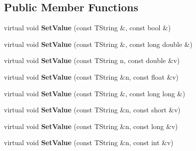 \subsection*{Public Member Functions}
\begin{DoxyCompactItemize}
\item 
\hypertarget{class_h_a_l_1_1_analysis_data_a3870a72f6b39f3b4509b2498d285d94a}{virtual void {\bfseries Set\-Value} (const T\-String \&, const bool \&)}\label{class_h_a_l_1_1_analysis_data_a3870a72f6b39f3b4509b2498d285d94a}

\item 
\hypertarget{class_h_a_l_1_1_analysis_data_af74aff588a73f1c4d0a5e5ecbad14efb}{virtual void {\bfseries Set\-Value} (const T\-String \&, const long double \&)}\label{class_h_a_l_1_1_analysis_data_af74aff588a73f1c4d0a5e5ecbad14efb}

\item 
\hypertarget{class_h_a_l_1_1_analysis_data_ae88cc39a2594cf0bb969e3626cf17412}{virtual void {\bfseries Set\-Value} (const T\-String n, const double \&v)}\label{class_h_a_l_1_1_analysis_data_ae88cc39a2594cf0bb969e3626cf17412}

\item 
\hypertarget{class_h_a_l_1_1_analysis_data_a3953675a3b647f8c87eb214e25940d77}{virtual void {\bfseries Set\-Value} (const T\-String \&n, const float \&v)}\label{class_h_a_l_1_1_analysis_data_a3953675a3b647f8c87eb214e25940d77}

\item 
\hypertarget{class_h_a_l_1_1_analysis_data_ad18a729c4979bacc30d32e0802520236}{virtual void {\bfseries Set\-Value} (const T\-String \&, const long long \&)}\label{class_h_a_l_1_1_analysis_data_ad18a729c4979bacc30d32e0802520236}

\item 
\hypertarget{class_h_a_l_1_1_analysis_data_a2d3510dc4ee329387906e8738061b6b4}{virtual void {\bfseries Set\-Value} (const T\-String \&n, const short \&v)}\label{class_h_a_l_1_1_analysis_data_a2d3510dc4ee329387906e8738061b6b4}

\item 
\hypertarget{class_h_a_l_1_1_analysis_data_af8f2df54ad897dce65aa6224cac0af7c}{virtual void {\bfseries Set\-Value} (const T\-String \&n, const long \&v)}\label{class_h_a_l_1_1_analysis_data_af8f2df54ad897dce65aa6224cac0af7c}

\item 
\hypertarget{class_h_a_l_1_1_analysis_data_a697cb757197048cbcc5716bb32499c60}{virtual void {\bfseries Set\-Value} (const T\-String \&n, const int \&v)}\label{class_h_a_l_1_1_analysis_data_a697cb757197048cbcc5716bb32499c60}


\end{DoxyCompactItemize}
